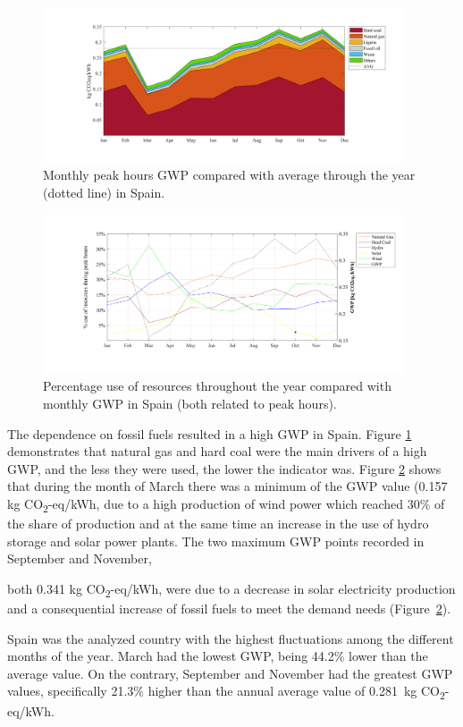 {{\begin{figure}[]
	\centering
	\includegraphics[width=0.95\textwidth]{ChapterLCA/Images/GWP_plots/Spain_GWP.png}
	\vspace*{-7mm}
	\caption{Monthly peak hours GWP compared with average through the year (dotted line) in Spain.}
	\label{GWP_ES}
\end{figure}

	
\begin{figure}[]
	\centering
	\hspace*{0.3cm}\includegraphics[width=0.95\textwidth]{ChapterLCA/Images/GWP_plots/Comp_GWP_ES.png}
	\vspace*{-10mm}
	\caption{Percentage use of resources throughout the year compared with monthly GWP in Spain (both related to peak hours).}
	\label{COMP_ES}
\end{figure}

The dependence on  fossil fuels resulted in a high GWP in Spain. Figure \ref{GWP_ES} demonstrates that natural gas and hard coal were the main drivers of a high GWP, and the less they were used, the lower the indicator was. Figure \ref{COMP_ES} shows that during the month of March there was a minimum of the GWP value {(0.157 kg CO\textsubscript2-eq/kWh}, due to a high production of wind power which reached 30\% of the share of production and at the same time an increase in the use of hydro storage and solar power plants. The two maximum GWP points recorded in September and November, {both  0.341 kg CO\textsubscript2-eq/kWh, were due to a decrease in solar electricity production and a consequential increase of fossil fuels to meet the demand needs (Figure~\ref{COMP_ES}). {Spain was the analyzed country with the highest fluctuations among the different months of the year. March had the lowest GWP, being 44.2\% lower than the average value. On the contrary, September and November had the greatest GWP values, specifically 21.3\% higher than the annual average value of 0.281~kg CO\textsubscript2-eq/kWh.


}}}}
